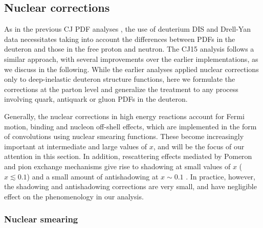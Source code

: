 \documentclass[aps,prd,amsmath,preprint]{revtex4}
\begin{document}
\subsection{Nuclear corrections}
\label{ssec:nuclear}

As in the previous CJ PDF analyses \cite{CJ10, CJ11, CJ12}, the use of
deuterium DIS and Drell-Yan data necessitates taking into account the
differences between PDFs in the deuteron and those in the free proton
and neutron.  The CJ15 analysis follows a similar approach, with several
improvements over the earlier implementations, as we discuss in the
following.  While the earlier analyses applied nuclear corrections only
to deep-inelastic deuteron structure functions, here we formulate the
corrections at the parton level and generalize the treatment to any
process involving quark, antiquark or gluon PDFs in the deuteron.


Generally, the nuclear corrections in high energy reactions account
for Fermi motion, binding and nucleon off-shell effects, which are
implemented in the form of convolutions using nuclear smearing
functions.  These become increasingly important at intermediate and
large values of $x$, and will be the focus of our attention in this
section.  In addition, rescattering effects mediated by Pomeron and
pion exchange mechanisms give rise to shadowing at small values of
$x$ ($x \lesssim 0.1$) \cite{Badelek92, MTshad} and a small amount
of antishadowing at $x \sim 0.1$ \cite{Kaptari91, MTshad}.
In practice, however, the shadowing and antishadowing corrections
are very small, and have negligible effect on the phenomenology in
our analysis.


\subsubsection{Nuclear smearing}
\label{sssec:smear}
\end{document}
